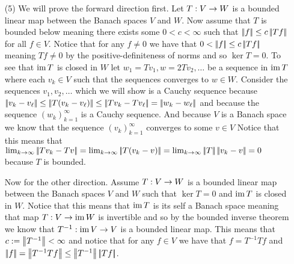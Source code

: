 \documentclass[12pt]{amsart}
\begin{document}
\begin{itemize}
   \item[(5)] %
   We will prove the forward direction first. 
   Let $T:V\rightarrow W$ is a bounded linear map between the Banach spaces $V$ and $W$. 
   Now assume that $T$ is bounded below meaning there exists some $0<c<\infty$ 
   such that $\norm{f}\leq c\norm{Tf}$ for all $f\in V$. Notice that for any 
   $f\neq 0$ we have that $0<\norm{f}\leq c\norm{Tf}$ meaning $Tf\neq 0$ by the 
   positive-definiteness of norms and so $\ker T=0$. To see that $\operatorname{\mathrm{im}} T$ is closed 
   in $W$ let $w_1=Tv_1,w=2Tv_2,\dots$ be a sequence in $\operatorname{\mathrm{im}} T$ where each $v_k\in V$ 
   such that the sequences converges to $w\in W$. Consider the sequences $v_1, v_2,\dots$ 
   which we will show is a Cauchy sequence because 
   $\norm{v_k-v_\ell}\leq\norm{T(v_k-v_\ell)}\leq \norm{Tv_k-Tv_\ell}=\norm{w_k-w_\ell}$ 
   and because the sequence $(w_k)_{k=1}^\infty$ is a Cauchy sequence. And because $V$ 
   is a Banach space we know that the sequence $(v_k)_{k=1}^\infty$ converges to some $v\in V$
   Notice that this means that $\lim_{k\ra\infty} \norm{Tv_k-Tv}=\lim_{k\ra\infty} \norm{T(v_k-v)}=\lim_{k\ra\infty} \norm{T}\norm{v_k-v}=0$
   because $T$ is bounded.



   Now for the other direction. Assume $T:V\rightarrow W$ is a bounded linear map between the Banach spaces $V$ and $W$ such that
   $\ker T=0$ and $\operatorname{\mathrm{im}} T$ is closed in $W$.
   Notice that this means that $\operatorname{\mathrm{im}} T$ is its self a Banach space meaning that map 
   $T:V\rightarrow\operatorname{\mathrm{im}} W$ is invertible and so by the bounded inverse theorem we know that 
   $T^{-1}:\operatorname{\mathrm{im}} V \rightarrow V$ is a bounded linear map. This means that $c:=\norm{T^{-1}}<\infty$ 
   and notice that for any $f\in V$ we have that $f=T^{-1}Tf$ and $\norm{f}=\norm{T^{-1}Tf}\leq \norm{T^{-1}}\norm{Tf}$.
\end{itemize}
\end{document}
